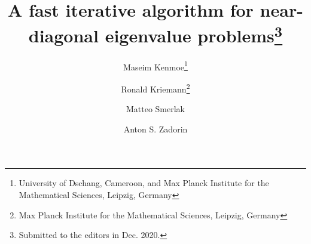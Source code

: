 

\usepackage{lipsum}
\usepackage{amsfonts}
\usepackage{amsmath,amssymb}
\usepackage{graphicx}
\usepackage{epstopdf}
\usepackage{algorithmic}
\usepackage{cleveref}



\title{A fast iterative algorithm for  near-diagonal eigenvalue problems\thanks{Submitted to the editors in Dec. 2020. }}

\author{Maseim Kenmoe\thanks{University of Dschang, Cameroon, and Max Planck Institute for the Mathematical Sciences, Leipzig, Germany}
\and Ronald Kriemann\thanks{Max Planck Institute for the Mathematical Sciences, Leipzig, Germany}
\and Matteo Smerlak\footnotemark[3]
\and Anton S. Zadorin\footnotemark[3]}

\usepackage{amsopn}
\DeclareMathOperator{\diag}{diag}


